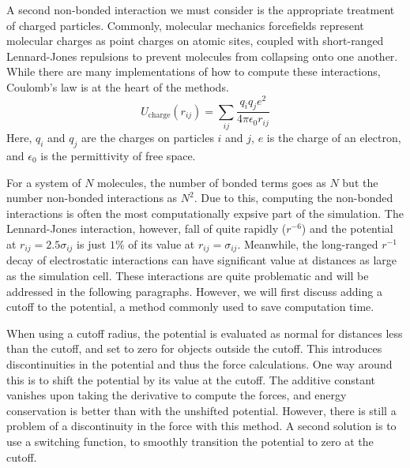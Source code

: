 A second non-bonded interaction we must consider is the appropriate
treatment of charged particles. Commonly, molecular mechanics
forcefields represent molecular charges as point charges on atomic
sites, coupled with short-ranged Lennard-Jones repulsions to prevent
molecules from collapsing onto one another. While there are many
implementations of how to compute these interactions, Coulomb's law is
at the heart of the methods.
\begin{equation}\label{eq:coulomb}
U_{\mathrm{charge}}(r_{ij}) = \sum_{ij}\frac{q_i q_j e^2}{4 \pi \epsilon_0
  r_{ij}}
\end{equation}
Here, $q_i$ and $q_j$ are the charges on particles $i$ and $j$, $e$ is
the charge of an electron, and $\epsilon_0$ is the permittivity of
free space. 

For a system of $N$ molecules, the number of bonded terms goes as $N$
but the number non-bonded interactions as $N^2$. Due to this,
computing the non-bonded interactions is often the most
computationally expsive part of the simulation. The Lennard-Jones
interaction, however, fall of quite rapidly ($r^{-6}$) and the
potential at $r_{ij} = 2.5\sigma_{ij}$ is just $1 \%$ of its value at
$r_{ij} = \sigma_{ij}$. Meanwhile, the long-ranged $r^{-1}$ decay of
electrostatic interactions can have significant value at distances as
large as the simulation cell. These interactions are quite problematic
and will be addressed in the following paragraphs. However, we will
first discuss adding a cutoff to the potential, a method commonly
used to save computation time.


When using a cutoff radius, the potential is evaluated as normal for
distances less than the cutoff, and set to zero for objects outside
the cutoff. This introduces discontinuities in the potential and thus
the force calculations. One way around this is to shift the potential
by its value at the cutoff.  The additive constant vanishes upon
taking the derivative to compute the forces, and energy conservation
is better than with the unshifted potential. However, there is still a
problem of a discontinuity in the force with this method. A second
solution is to use a switching function, to smoothly transition the
potential to zero at the cutoff.

